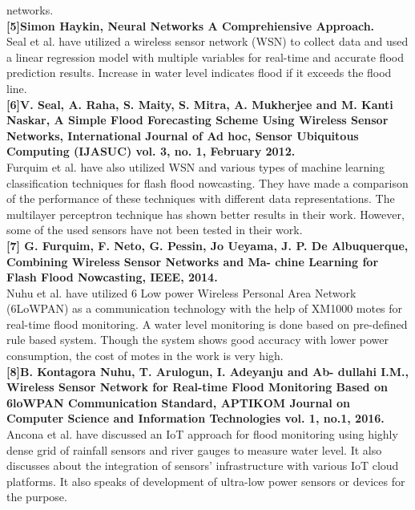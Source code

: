 \documentclass[a4paper,12pt]{report}
\begin{document}
\begin{itemize}
networks. \\
\textbf{[5]Simon Haykin, Neural Networks A Comprehiensive
Approach.}\\ 
Seal et al. have utilized a wireless sensor network
(WSN) to collect data and used a linear regression model with
multiple variables for real-time and accurate flood prediction
results. Increase in water level indicates flood if it exceeds the
flood line. \\
\textbf{[6]V. Seal, A. Raha, S. Maity, S. Mitra, A. Mukherjee and
M. Kanti Naskar, A Simple Flood Forecasting Scheme
Using Wireless Sensor Networks, International Journal
of Ad hoc, Sensor Ubiquitous Computing (IJASUC)
vol. 3, no. 1, February 2012.}\\
 Furquim et al. have also utilized WSN and various
types of machine learning classification techniques for flash
flood nowcasting. They have made a comparison of the
performance of these techniques with different data
representations. The multilayer perceptron technique has shown
better results in their work. However, some of the used sensors
have not been tested in their work.\\
\textbf{[7] G. Furquim, F. Neto, G. Pessin, Jo Ueyama, J. P. De
Albuquerque, Combining Wireless Sensor Networks and Ma-
chine Learning for Flash Flood Nowcasting, IEEE, 2014.}\\
Nuhu et al. have utilized 6 Low power Wireless Personal
Area Network (6LoWPAN) as a communication technology
with the help of XM1000 motes for real-time flood monitoring.
A water level monitoring is done based on pre-defined rule
based system. Though the system shows good accuracy with
lower power consumption, the cost of motes in the work is very
high. \\
\textbf{[8]B. Kontagora Nuhu, T. Arulogun, I. Adeyanju and Ab-
dullahi I.M., Wireless Sensor Network for Real-time
Flood Monitoring Based on 6loWPAN Communication
Standard, APTIKOM Journal on Computer Science
and Information Technologies vol. 1, no.1, 2016.}\\
 Ancona et al. have discussed an IoT approach for flood
monitoring using highly dense grid of rainfall sensors and river
gauges to measure water level. It also discusses about the
integration of sensors’ infrastructure with various IoT cloud
platforms. It also speaks of development of ultra-low power
sensors or devices for the purpose.\\


\end{itemize}
\end{document}
